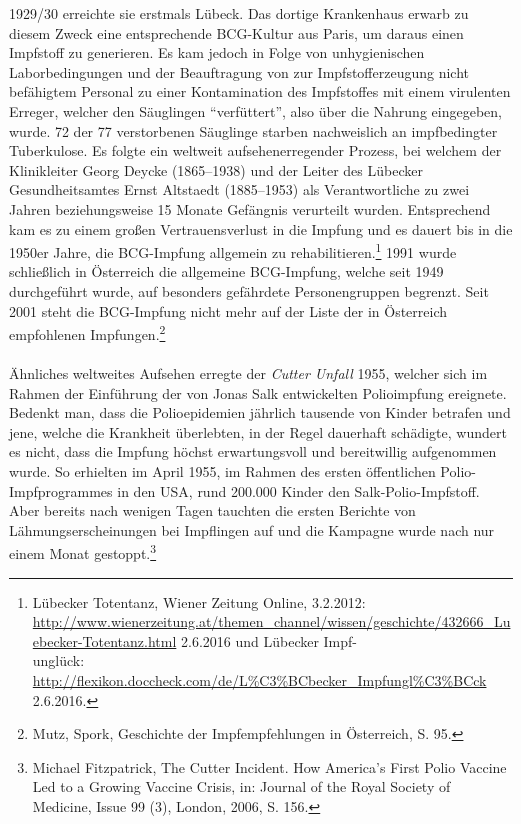 \documentclass[
    a4paper,
    12pt,
    hyphens,
    chapterprefix=true,
    headheight=33pt,
    footheight=29pt,
    headings=optiontohead, %
]{scrartcl}
\begin{document}
1929/30 erreichte sie erstmals Lübeck. Das dortige Krankenhaus erwarb zu diesem Zweck eine entsprechende BCG-Kultur aus Paris, 
um daraus einen Impfstoff zu generieren. Es kam jedoch in Folge von unhygienischen Laborbedingungen und der Beauftragung von zur Impfstofferzeugung 
nicht befähigtem Personal zu einer Kontamination des Impfstoffes mit einem virulenten Erreger, welcher den Säuglingen "`verfüttert"', 
also über die Nahrung eingegeben, wurde. 72 der 77 verstorbenen Säuglinge starben nachweislich an impfbedingter Tuberkulose. 
Es folgte ein weltweit aufsehenerregender Prozess, bei welchem der Klinikleiter Georg Deycke (1865--1938) und der Leiter des Lübecker Gesundheitsamtes 
Ernst Altstaedt (1885--1953) als Verantwortliche zu zwei Jahren beziehungsweise 15 Monate Gefängnis verurteilt wurden. Entsprechend kam es zu 
einem großen Vertrauensverlust in die Impfung und es dauert bis in die 1950er Jahre, die BCG-Impfung allgemein zu rehabilitieren.\footnote{Lübecker Totentanz, Wiener Zeitung Online, 3.2.2012: \url{http://www.wienerzeitung.at/themen_channel/wissen/geschichte/432666_Luebecker-Totentanz.html} 2.6.2016 und 
Lübecker Impf-\\unglück: \url{http://flexikon.doccheck.com/de/L\%C3\%BCbecker_Impfungl\%C3\%BCck} 2.6.2016.} 
1991 wurde schließlich in Österreich die allgemeine BCG-Impfung, welche seit 1949 durchgeführt wurde, auf besonders 
gefährdete Personengruppen begrenzt. Seit 2001 steht die BCG-Impfung nicht mehr auf der Liste der in Österreich empfohlenen 
Impfungen.\footnote{Mutz, Spork, Geschichte der Impfempfehlungen in Österreich, S. 95.}\\
\\
Ähnliches weltweites Aufsehen erregte der \textit{Cutter Unfall} 1955, welcher sich im Rahmen der Einführung der von Jonas 
Salk entwickelten Polioimpfung ereignete. Bedenkt man, dass die Polioepidemien jährlich tausende von Kinder betrafen und jene, 
welche die Krankheit überlebten, in der Regel dauerhaft schädigte, wundert es nicht, dass die Impfung höchst erwartungsvoll und bereitwillig aufgenommen wurde. So erhielten im April 1955, im Rahmen des ersten öffentlichen 
Polio-Impfprogrammes in den USA, rund 200.000 Kinder den Salk-Polio-Impfstoff. Aber bereits nach wenigen Tagen tauchten die 
ersten Berichte von Lähmungserscheinungen bei Impflingen auf und die Kampagne wurde nach nur einem Monat gestoppt.\footnote{Michael Fitzpatrick, The Cutter Incident. How America's First Polio Vaccine Led to a Growing Vaccine Crisis, in: 
Journal of the Royal Society of Medicine, Issue 99 (3), London, 2006, S. 156.} 
\end{document}
